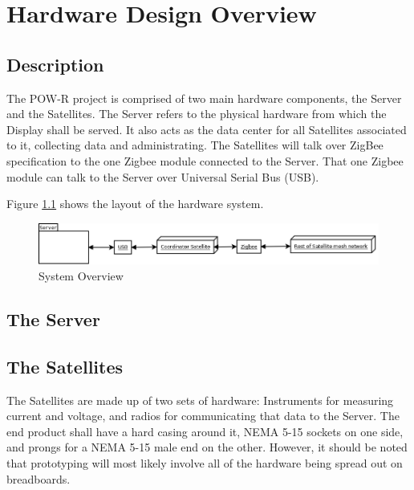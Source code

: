 
\chapter{Hardware Design Overview}

\section{Description}

The POW-R project is comprised of two main hardware components, the Server and the Satellites. 
The Server refers to the physical hardware from which the Display shall be served. 
It also acts as the data center for all Satellites associated to it, collecting data and administrating. 
The Satellites will talk over ZigBee specification to the one Zigbee module connected to the Server. 
That one Zigbee module can talk to the Server over Universal Serial Bus (USB).
 
Figure \ref{SystemOverview} shows the layout of the hardware system.
\begin{figure}[H]
\centering
\includegraphics[scale=0.3]{Hardware/images/SystemOverview.png}
\caption{System Overview}
\label{SystemOverview}
\end{figure}

\section{The Server}


%

\section{The Satellites}
The Satellites are made up of two sets of hardware: 
Instruments for measuring current and voltage, and radios for communicating that data to the Server. 
The end product shall have a hard casing around it, NEMA 5-15 sockets on one side, and prongs for a NEMA 5-15 male end on the other. 
However, it should be noted that prototyping will most likely involve all of the hardware being spread out on breadboards.


